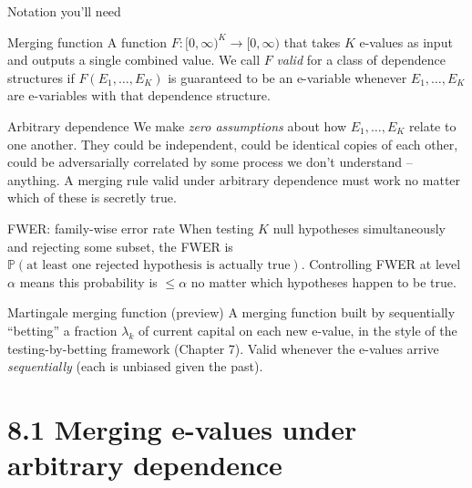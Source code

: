 \documentclass[aspectratio=169,10pt]{beamer}
\newcommand{\Pb}{\mathbb{P}}
\begin{document}
\begin{frame}[allowframebreaks]{Notation you'll need}
  \begin{block}{Merging function}
    A function $F : [0,\infty)^K \to [0,\infty)$ that takes $K$ e-values as input and outputs a single combined value. We call $F$ \emph{valid} for a class of dependence structures if $F(E_1,\dots,E_K)$ is guaranteed to be an e-variable whenever $E_1,\dots,E_K$ are e-variables with that dependence structure.
  \end{block}

  \begin{block}{Arbitrary dependence}
    We make \emph{zero assumptions} about how $E_1,\dots,E_K$ relate to one another. They could be independent, could be identical copies of each other, could be adversarially correlated by some process we don't understand -- anything. A merging rule valid under arbitrary dependence must work no matter which of these is secretly true.
  \end{block}

  \begin{block}{FWER: family-wise error rate}
    When testing $K$ null hypotheses simultaneously and rejecting some subset, the FWER is $\Pb(\text{at least one rejected hypothesis is actually true})$. Controlling FWER at level $\alpha$ means this probability is $\leq \alpha$ no matter which hypotheses happen to be true.
  \end{block}

  \begin{block}{Martingale merging function (preview)}
    A merging function built by sequentially ``betting'' a fraction $\lambda_k$ of current capital on each new e-value, in the style of the testing-by-betting framework (Chapter 7). Valid whenever the e-values arrive \emph{sequentially} (each is unbiased given the past).
  \end{block}
\end{frame}

\section{8.1 Merging e-values under arbitrary dependence}
\end{document}
